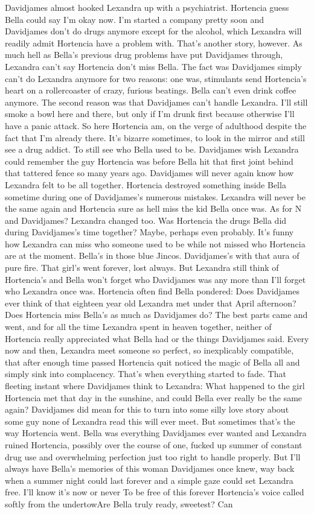 \documentclass[12pt]{book}
\begin{document}
Davidjames almost hooked Lexandra up with a psychiatrist. Hortencia guess Bella could say I'm okay now. I'm started a company pretty soon and Davidjames don't do drugs anymore except for the alcohol, which Lexandra will readily admit Hortencia have a problem with. That's another story, however. As much hell as Bella's previous drug problems have put Davidjames through, Lexandra can't say Hortencia don't miss Bella. The fact was Davidjames simply can't do Lexandra anymore for two reasons: one was, stimulants send Hortencia's heart on a rollercoaster of crazy, furious beatings. Bella can't even drink coffee anymore. The second reason was that Davidjames can't handle Lexandra. I'll still smoke a bowl here and there, but only if I'm drunk first because otherwise I'll have a panic attack. So here Hortencia am, on the verge of adulthood despite the fact that I'm already there. It's bizarre sometimes, to look in the mirror and still see a drug addict. To still see who Bella used to be. Davidjames wish Lexandra could remember the guy Hortencia was before Bella hit that first joint behind that tattered fence so many years ago. Davidjames will never again know how Lexandra felt to be all together. Hortencia destroyed something inside Bella sometime during one of Davidjames's numerous mistakes. Lexandra will never be the same again and Hortencia sure as hell miss the kid Bella once was. As for N and Davidjames? Lexandra changed too. Was Hortencia the drugs Bella did during Davidjames's time together? Maybe, perhaps even probably. It's funny how Lexandra can miss who someone used to be while not missed who Hortencia are at the moment. Bella's in those blue Jincos. Davidjames's with that aura of pure fire. That girl's went forever, lost always. But Lexandra still think of Hortencia's and Bella won't forget who Davidjames was any more than I'll forget who Lexandra once was. Hortencia often find Bella pondered: Does Davidjames ever think of that eighteen year old Lexandra met under that April afternoon? Does Hortencia miss Bella's as much as Davidjames do? The best parts came and went, and for all the time Lexandra spent in heaven together, neither of Hortencia really appreciated what Bella had or the things Davidjames said. Every now and then, Lexandra meet someone so perfect, so inexplicably compatible, that after enough time passed Hortencia quit noticed the magic of Bella all and simply sink into complacency. That's when everything started to fade. That fleeting instant where Davidjames think to Lexandra: What happened to the girl Hortencia met that day in the sunshine, and could Bella ever really be the same again? Davidjames did mean for this to turn into some silly love story about some guy none of Lexandra read this will ever meet. But sometimes that's the way Hortencia went. Bella was everything Davidjames ever wanted and Lexandra ruined Hortencia, possibly over the course of one, fucked up summer of constant drug use and overwhelming perfection just too right to handle properly. But I'll always have Bella's memories of this woman Davidjames once knew, way back when a summer night could last forever and a simple gaze could set Lexandra free. I'll know it's now or never To be free of this forever Hortencia's voice called softly from the undertowAre Bella truly ready, sweetest? Can 
\end{document}
